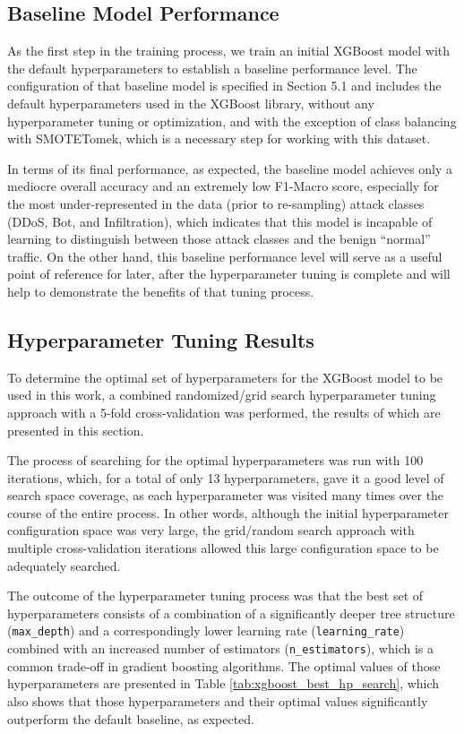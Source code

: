 \subsection{Baseline Model Performance}

As the first step in the training process, we train an initial XGBoost model with the default hyperparameters to establish a baseline performance level. The configuration of that baseline model is specified in Section 5.1 and includes the default hyperparameters used in the XGBoost library, without any hyperparameter tuning or optimization, and with the exception of class balancing with SMOTETomek, which is a necessary step for working with this dataset.

In terms of its final performance, as expected, the baseline model achieves only a mediocre overall accuracy and an extremely low F1-Macro score, especially for the most under-represented in the data (prior to re-sampling) attack classes (DDoS, Bot, and Infiltration), which indicates that this model is incapable of learning to distinguish between those attack classes and the benign “normal” traffic. On the other hand, this baseline performance level will serve as a useful point of reference for later, after the hyperparameter tuning is complete and will help to demonstrate the benefits of that tuning process.

\subsection{Hyperparameter Tuning Results}

To determine the optimal set of hyperparameters for the XGBoost model to be used in this work, a combined randomized/grid search hyperparameter tuning approach with a 5-fold cross-validation was performed, the results of which are presented in this section.

The process of searching for the optimal hyperparameters was run with 100 iterations, which, for a total of only 13 hyperparameters, gave it a good level of search space coverage, as each hyperparameter was visited many times over the course of the entire process. In other words, although the initial hyperparameter configuration space was very large, the grid/random search approach with multiple cross-validation iterations allowed this large configuration space to be adequately searched.

The outcome of the hyperparameter tuning process was that the best set of hyperparameters consists of a combination of a significantly deeper tree structure (\texttt{max\_depth}) and a correspondingly lower learning rate (\texttt{learning\_rate}) combined with an increased number of estimators (\texttt{n\_estimators}), which is a common trade-off in gradient boosting algorithms. The optimal values of those hyperparameters are presented in Table \ref{tab:xgboost_best_hp_search}, which also shows that those hyperparameters and their optimal values significantly outperform the default baseline, as expected.

